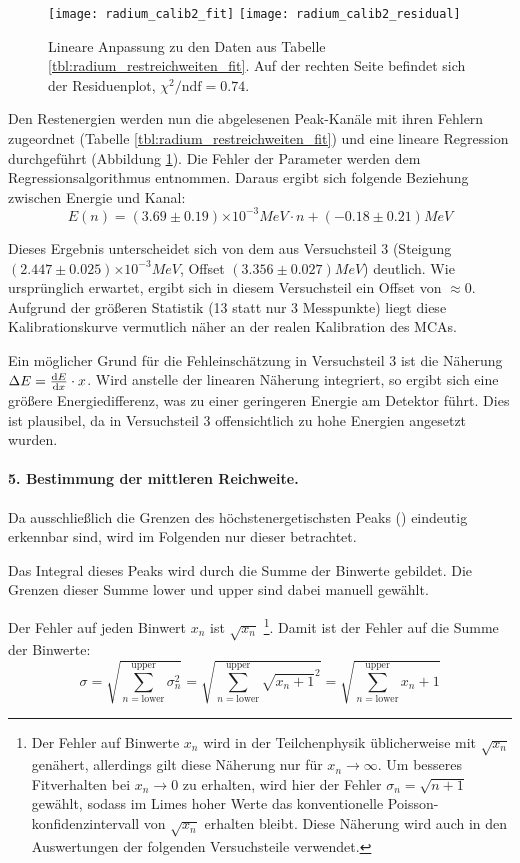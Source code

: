 \documentclass{../Misc/MontavonLaTeX/Montavon}
\newcommand{\e}[1]{\ensuremath{\times 10^{#1}}}
\newcommand{\halfwidth}{0.48\textwidth}
\begin{document}
\begin{figure}[htbp]
\texttt{[image: radium\_calib2\_fit]}
\texttt{[image: radium\_calib2\_residual]}
\caption{Lineare Anpassung zu den Daten aus Tabelle \ref{tbl:radium_restreichweiten_fit}. Auf der rechten Seite befindet sich der Residuenplot, $\chi^2 / \textrm{ndf} = 0.74$.}
\label{fig:radium_restreichweiten_fit}
\end{figure}

Den Restenergien werden nun die abgelesenen Peak-Kanäle mit ihren Fehlern zugeordnet (Tabelle \ref{tbl:radium_restreichweiten_fit}) und eine lineare Regression durchgeführt (Abbildung \ref{fig:radium_restreichweiten_fit}). Die Fehler der Parameter werden dem Regressionsalgorithmus entnommen.
Daraus ergibt sich folgende Beziehung zwischen Energie und Kanal:
\[
	E(n) = (3.69 \pm 0.19) \e{-3} \unit{MeV} \cdot n + (-0.18 \pm 0.21) \unit{MeV}
\]

Dieses Ergebnis unterscheidet sich von dem aus Versuchsteil 3 (Steigung $(2.447 \pm 0.025) \e{-3} \unit{MeV}$, Offset $(3.356 \pm 0.027) \unit{MeV}$) deutlich. Wie ursprünglich erwartet, ergibt sich in diesem Versuchsteil ein Offset von $\approx 0$. Aufgrund der größeren Statistik (13 statt nur 3 Messpunkte) liegt diese Kalibrationskurve vermutlich näher an der realen Kalibration des MCAs.

Ein möglicher Grund für die Fehleinschätzung in Versuchsteil 3 ist die Näherung $\Delta E = \frac{\mathrm d E}{\mathrm d x} \cdot x$. Wird anstelle der linearen Näherung integriert, so ergibt sich eine größere Energiedifferenz, was zu einer geringeren Energie am Detektor führt. Dies ist plausibel, da in Versuchsteil 3 offensichtlich zu hohe Energien angesetzt wurden.

\paragraph{5. Bestimmung der mittleren Reichweite.}
Da ausschließlich die Grenzen des höchstenergetischsten Peaks () eindeutig erkennbar sind, wird im Folgenden nur dieser betrachtet.

Das Integral dieses Peaks wird durch die Summe der Binwerte gebildet. Die Grenzen dieser Summe $\textrm{lower}$ und $\textrm{upper}$ sind dabei manuell gewählt. 

Der Fehler auf jeden Binwert $x_n$ ist $\sqrt{x_n}$ \footnote{Der Fehler auf Binwerte $x_n$ wird in der Teilchenphysik üblicherweise mit $\sqrt{x_n}$ genähert, allerdings gilt diese Näherung nur für $x_n \rightarrow \infty$. Um besseres Fitverhalten bei $x_n \rightarrow 0$ zu erhalten, wird hier der Fehler $\sigma_n = \sqrt{n+1}$ gewählt, sodass im Limes hoher Werte das konventionelle Poisson-konfidenzintervall von $\sqrt{x_n}$ erhalten bleibt. Diese Näherung wird auch in den Auswertungen der folgenden Versuchsteile verwendet.}. Damit ist der Fehler auf die Summe der Binwerte:
\[
	\sigma = \sqrt{\sum_{n=\textrm{lower}}^\textrm{upper} \sigma_n^2} = \sqrt{\sum_{n=\textrm{lower}}^\textrm{upper} \sqrt{x_n+1}^2} = \sqrt{\sum_{n=\textrm{lower}}^\textrm{upper} x_n+1} 
\]
\end{document}
